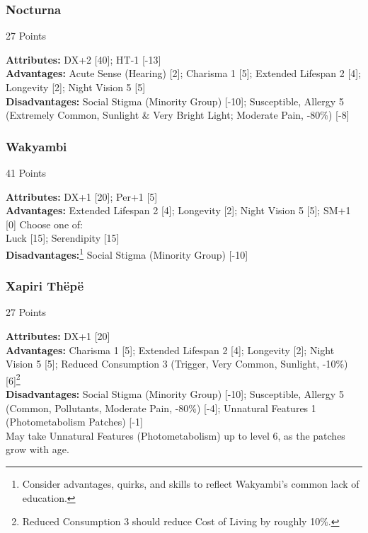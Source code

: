 \begin{multicols*}{3}
	\subsubsection*{Nocturna}
	\begin{flushright}
		27 Points
	\end{flushright}
	\textbf{Attributes:} 
	DX+2 [40]; HT-1 [-13]
	\\\textbf{Advantages:} 
	Acute Sense (Hearing) [2]; Charisma 1 [5]; Extended Lifespan 2 [4]; Longevity [2]; Night Vision 5 [5]
	\\\textbf{Disadvantages:} 
	Social Stigma (Minority Group) [-10]; Susceptible, Allergy 5 (Extremely Common, Sunlight \& Very Bright Light; Moderate Pain, -80\%) [-8]
	
	\subsubsection*{Wakyambi}
	\begin{flushright}
		41 Points
	\end{flushright}
	\textbf{Attributes:} 
	DX+1 [20]; Per+1 [5]
	\\\textbf{Advantages:} 
	Extended Lifespan 2 [4]; Longevity [2]; Night Vision 5 [5]; SM+1 [0]
	Choose one of: \\
	Luck [15]; Serendipity [15]
	\\\textbf{Disadvantages:}\footnote{Consider advantages, quirks, and skills to reflect Wakyambi's common lack of education.}
	Social Stigma (Minority Group) [-10]
	
	\subsubsection*{Xapiri Thëpë}
	\begin{flushright}
		27 Points
	\end{flushright}
	\textbf{Attributes:} 
	DX+1 [20]
	\\\textbf{Advantages:} 
	Charisma 1 [5]; Extended Lifespan 2 [4]; Longevity [2]; Night Vision 5 [5]; Reduced Consumption 3 (Trigger, Very Common, Sunlight, -10\%)[6]\footnote{Reduced Consumption 3 should reduce Cost of Living by roughly 10\%.}
	\\\textbf{Disadvantages:} 
	Social Stigma (Minority Group) [-10]; Susceptible, Allergy 5 (Common, Pollutants, Moderate Pain, -80\%) [-4]; Unnatural Features 1 (Photometabolism Patches) [-1]
	\\ May take Unnatural Features (Photometabolism) up to level 6, as the patches grow with age.
	

\end{multicols*}
